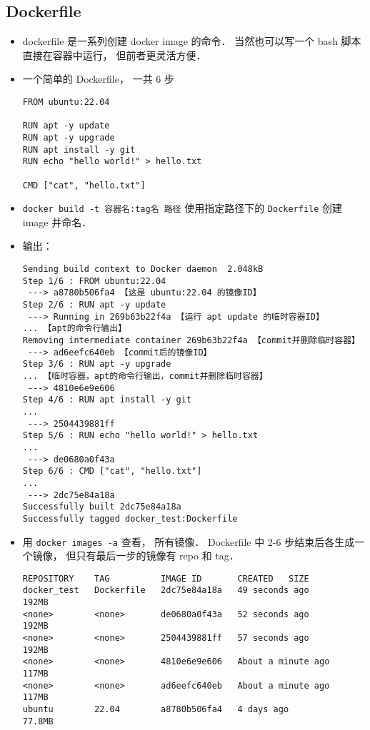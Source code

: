 \subsection{Dockerfile}
\begin{itemize}
\item dockerfile 是一系列创建 docker image 的命令． 当然也可以写一个 bash 脚本直接在容器中运行， 但前者更灵活方便．
\item 一个简单的 Dockerfile， 一共 6 步
\begin{lstlisting}[language=none]
FROM ubuntu:22.04

RUN apt -y update
RUN apt -y upgrade
RUN apt install -y git
RUN echo "hello world!" > hello.txt

CMD ["cat", "hello.txt"]
\end{lstlisting}
\item \verb|docker build -t 容器名:tag名 路径| 使用指定路径下的 \verb|Dockerfile| 创建 image 并命名．
\item 输出：
\begin{lstlisting}[language=none]
Sending build context to Docker daemon  2.048kB
Step 1/6 : FROM ubuntu:22.04
 ---> a8780b506fa4 【这是 ubuntu:22.04 的镜像ID】
Step 2/6 : RUN apt -y update
 ---> Running in 269b63b22f4a 【运行 apt update 的临时容器ID】
... 【apt的命令行输出】
Removing intermediate container 269b63b22f4a 【commit并删除临时容器】
 ---> ad6eefc640eb 【commit后的镜像ID】
Step 3/6 : RUN apt -y upgrade
... 【临时容器，apt的命令行输出，commit并删除临时容器】
 ---> 4810e6e9e606
Step 4/6 : RUN apt install -y git
...
 ---> 2504439881ff
Step 5/6 : RUN echo "hello world!" > hello.txt
...
 ---> de0680a0f43a
Step 6/6 : CMD ["cat", "hello.txt"]
...
 ---> 2dc75e84a18a
Successfully built 2dc75e84a18a
Successfully tagged docker_test:Dockerfile
\end{lstlisting}
\item 用 \verb|docker images -a| 查看， 所有镜像． Dockerfile 中 2-6 步结束后各生成一个镜像， 但只有最后一步的镜像有 repo 和 tag．
\begin{lstlisting}[language=none]
REPOSITORY    TAG          IMAGE ID       CREATED   SIZE
docker_test   Dockerfile   2dc75e84a18a   49 seconds ago       192MB
<none>        <none>       de0680a0f43a   52 seconds ago       192MB
<none>        <none>       2504439881ff   57 seconds ago       192MB
<none>        <none>       4810e6e9e606   About a minute ago   117MB
<none>        <none>       ad6eefc640eb   About a minute ago   117MB
ubuntu        22.04        a8780b506fa4   4 days ago           77.8MB
\end{lstlisting}

\end{itemize}
